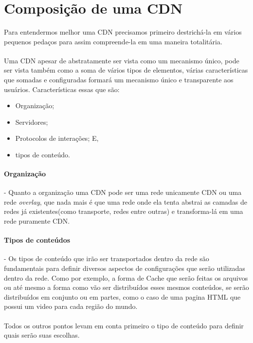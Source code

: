 \section{Composi\c{c}\~ao de uma CDN} \label{sec:composicao}
\paragraph{}
Para entendermos melhor uma CDN precisamos primeiro destrich\'a-la em v\'arios pequenos peda\c{c}os para assim compreende-la em uma maneira totalit\'aria.
\paragraph{}
Uma CDN apesar de abstratamente ser vista como um mecanismo \'unico, pode ser vista tamb\'em como a soma de v\'arios tipos de elementos, v\'arias caracter\'isticas que somadas e configuradas formar\'a um mecanismo \'unico e transparente aos usu\'arios. Caracter\'isticas essas que s\~ao:
\begin{itemize}
\item Organiza\c{c}\~ao;
\item Servidores;
\item Protocolos de intera\c{c}\~oes; E,
\item tipos de conte\'udo.
\end{itemize}

\paragraph{Organiza\c{c}\~ao}- Quanto a organiza\c{c}\~ao uma CDN pode ser uma rede unicamente CDN ou uma rede \textit{overlay}, que nada mais \'e que uma rede onde ela tenta abstrai as camadas de redes j\'a existentes(como transporte, redes entre outras) e transforma-l\'a em uma rede puramente CDN.

\paragraph{Tipos de conte\'udos}- Os tipos de conte\'udo que ir\~ao ser transportados dentro da rede s\~ao fundamentais para definir diversos aspectos de configura\c{c}\~oes que ser\~ao utilizadas dentro da rede. Como por exemplo, a forma de Cache que ser\~ao feitas os arquivos ou at\'e mesmo a forma como v\~ao ser distribu\'idos esses mesmos conte\'udos, se ser\~ao distribu\'idos em conjunto ou em partes, como o caso de uma pagina HTML que possui um video para cada regi\~ao do  mundo. 
\paragraph{}
Todos os outros pontos levam em conta primeiro o tipo de conte\'udo para definir quais ser\~ao suas escolhas.
